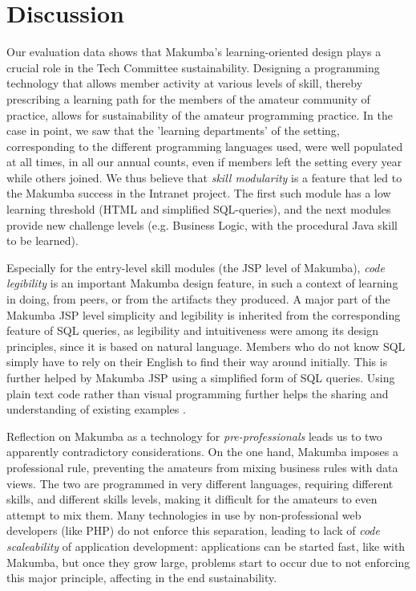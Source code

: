 \documentclass{llncs}
\begin{document}
\section{Discussion}\label{sec:disco}
Our evaluation data shows that Makumba's learning-oriented design  plays a crucial role in the Tech Committee sustainability. Designing a programming technology that allows member activity at various levels of skill, thereby prescribing a learning path for the members of the amateur community of practice, allows for sustainability of the amateur programming practice. In the case in point, we saw that the 'learning departments' of the setting, corresponding to the different programming languages used, were well populated at all times, in all our annual counts,  even if members left the setting every year while others joined. We thus believe that \textit{skill modularity} is a feature that led to the Makumba success in the Intranet project. The first such module has a low learning threshold (HTML and simplified SQL-queries), and the next modules provide new challenge levels (e.g. Business Logic, with the procedural Java skill to be learned).

Especially for the entry-level skill modules (the JSP level of Makumba), \textit{code legibility} is an important Makumba design feature, in such a context of learning in doing, from peers, or from the artifacts they produced. 
A major part of the Makumba JSP level simplicity and legibility is inherited from the corresponding feature of SQL queries, as legibility and intuitiveness were among its design principles, since it is based on natural language. Members who do not know SQL simply have to rely on their English to find their way around initially. This is further helped by Makumba JSP using a simplified form of SQL queries. Using plain text code rather than visual programming further helps the sharing and understanding of existing examples \cite{yamauchi00}. 

Reflection on Makumba as a technology for \textit{pre-professionals} \cite{stebbins79} leads us to two apparently contradictory considerations. On the one hand, Makumba imposes a professional rule, preventing the amateurs from mixing business rules with data views.  The two are programmed in very different languages, requiring different skills, and different skills levels, making  it difficult for the amateurs to even attempt to mix them. Many technologies in use by non-professional web developers (like PHP) do not enforce this separation, leading to lack of \textit{code scaleability} of application development: applications can be started fast, like with Makumba, but once they grow large, problems start to occur due to not enforcing this major principle, affecting in the end sustainability. 
\end{document}
